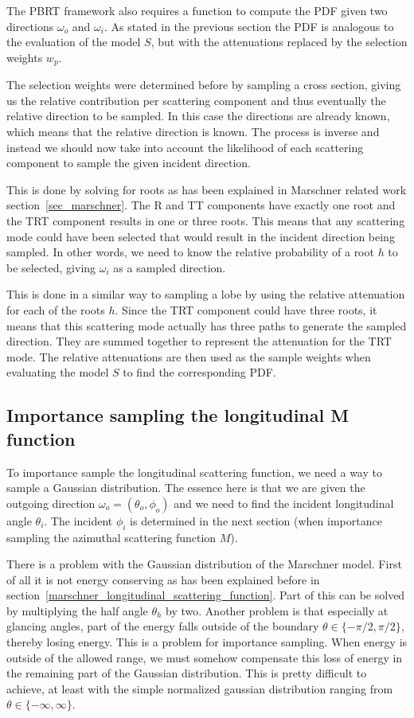 \documentclass[11pt,a4paper]{report}
\begin{document}
The PBRT framework also requires a function to compute the PDF given two directions $\omega_o$ and $\omega_i$. As stated in the previous section the PDF is analogous to the evaluation of the model $S$, but with the attenuations replaced by the selection weights $w_p$.

The selection weights were determined before by sampling a cross section, giving us the relative contribution per scattering component and thus eventually the relative direction to be sampled. In this case the directions are already known, which means that the relative direction is known. The process is inverse and instead we should now take into account the likelihood of each scattering component to sample the given incident direction.

This is done by solving for roots as has been explained in Marschner related work section~\ref{sec_marschner}. The R and TT components have exactly one root and the TRT component results in one or three roots. This means that any scattering mode could have been selected that would result in the incident direction being sampled. In other words, we need to know the relative probability of a root $h$ to be selected, giving $\omega_i$ as a sampled direction.

This is done in a similar way to sampling a lobe by using the relative attenuation for each of the roots $h$. Since the TRT component could have three roots, it means that this scattering mode actually has three paths to generate the sampled direction. They are summed together to represent the attenuation for the TRT mode. The relative attenuations are then used as the sample weights when evaluating the model $S$ to find the corresponding PDF.


\subsection{Importance sampling the longitudinal M function}
\label{sec_importance_sampling_M}

To importance sample the longitudinal scattering function, we need a way to sample a Gaussian distribution. The essence here is that we are given the outgoing direction $\omega_o = (\theta_o, \phi_o)$ and we need to find the incident longitudinal angle $\theta_i$. The incident $\phi_i$ is determined in the next section (when importance sampling the azimuthal scattering function $M$).

There is a problem with the Gaussian distribution of the Marschner model. First of all it is not energy conserving as has been explained before in section~\ref{marschner_longitudinal_scattering_function}. Part of this can be solved by multiplying the half angle $\theta_h$ by two. Another problem is that especially at glancing angles, part of the energy falls outside of the boundary $\theta \in \{ -\pi/2, \pi/2 \}$, thereby losing energy. This is a problem for importance sampling. When energy is outside of the allowed range, we must somehow compensate this loss of energy in the remaining part of the Gaussian distribution. This is pretty difficult to achieve, at least with the simple normalized gaussian distribution ranging from $\theta \in \{ -\infty, \infty \}$.
\end{document}
